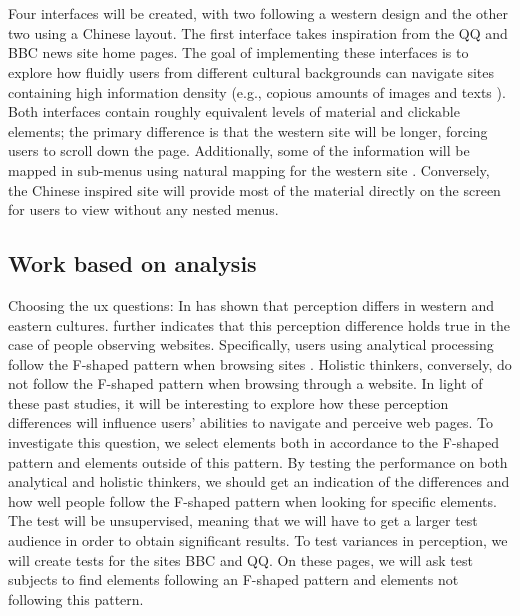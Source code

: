  \\\\
 Four interfaces will be created, with two following a western design and the other two using a Chinese layout. The first interface takes inspiration from the QQ and BBC news site home pages. The goal of implementing these interfaces is to explore how fluidly users from different cultural backgrounds can navigate sites containing high information density (e.g., copious amounts of images and texts ). Both interfaces contain roughly equivalent levels of material and clickable elements; the primary difference is that the western site will be longer, forcing users to scroll down the page. Additionally, some of the information will be mapped in sub-menus using natural mapping for the western site \cite{Norman}. Conversely, the Chinese inspired site will provide most of the material directly on the screen for users to view without any nested menus. 

  

 \subsection{Work based on analysis}
  Choosing the ux questions:
  In \cite{Holistic_vs_Analytic} has shown that perception differs in western and eastern cultures. \cite{cross_web} further indicates that this perception difference holds true in the case of people observing websites. Specifically, users using analytical processing follow the F-shaped pattern when browsing sites \cite{pernice2014people}. Holistic thinkers, conversely, do not follow the F-shaped pattern when browsing through a website. \cite{cross_web} In light of these past studies, it will be interesting to explore how these perception differences will influence users' abilities to navigate and perceive web pages. To investigate this question, we select elements both in accordance to the F-shaped pattern and elements outside of this pattern. By testing the performance on both analytical and holistic thinkers, we should get an indication of the differences and  how well people follow the F-shaped pattern when looking for specific elements. The test will be unsupervised, meaning that we will have to get a larger test audience in order to obtain significant results. To test variances in perception, we will create tests for the sites BBC and QQ. On these pages, we will ask test subjects to find elements following an F-shaped pattern and elements not following this pattern.
   
 